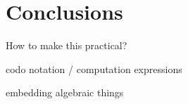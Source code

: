 \chapter{Conclusions} 
\label{ch:conclusions} 


How to make this practical?

codo notation / computation expressions

embedding algebraic things
